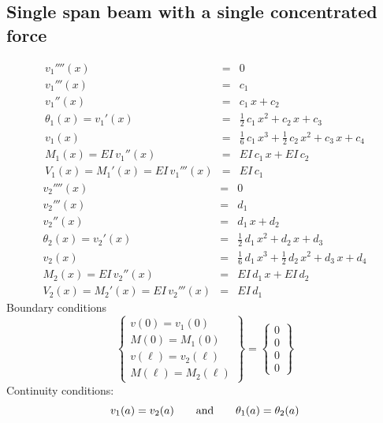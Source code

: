 \documentclass[11pt, oneside]{article}   	%
\begin{document}
\subsection{Single span beam with a single concentrated force}

\begin{eqnarray}
   v_1''''(x) &=&  0 \\
   v_1'''(x) &=&   c_1 \\
   v_1''(x) &=&   c_1\,x + c_2  \\
   \theta_1(x) = v_1'(x) &=&  \frac{1}{2} \,c_1\,x^2 + c_2\,x + c_3 \\
   v_1(x) &=&  \frac{1}{6} \,c_1\,x^3 + \frac{1}{2} \,c_2\,x^2+ c_3\,x + c_4 \\
   M_1(x) = EI \, v_1''(x) &=&  EI\,c_1\,x + EI\,c_2 \\
   V_1(x) = M_1'(x) = EI \, v_1'''(x) &=& EI\,c_1
   \label{B1}
\end{eqnarray}
\begin{eqnarray}
   v_2''''(x) &=&  0 \\
   v_2'''(x) &=&   d_1 \\
   v_2''(x) &=&   d_1\,x + d_2  \\
   \theta_2(x) = v_2'(x) &=&   \frac{1}{2} \,d_1\,x^2 + d_2\,x + d_3 \\
   v_2(x) &=&   \frac{1}{6} \,d_1\,x^3 + \frac{1}{2} \,d_2\,x^2+ d_3\,x + d_4 \\
   M_2(x) = EI \, v_2''(x) &=&  EI\,d_1\,x + EI\,d_2 \\
   V_2(x) = M_2'(x) = EI \, v_2'''(x) &=&  EI\,d_1
   \label{B2}
\end{eqnarray}
Boundary conditions
\begin{equation}
   \left\{ 
   \begin{array}{c}
   v(0) = v_1(0) \\
   M(0) = M_1(0) \\
   v(\ell) = v_2(\ell) \\
   M(\ell) = M_2(\ell)
   \end{array}
   \right\}
   =
   \left\{ 
   \begin{array}{c}
    0 \\
    0 \\
    0 \\
    0 
   \end{array}
   \right\}
   \label{B3}
\end{equation}
Continuity conditions:
\begin{equation}
   v_1(a) = v_2(a)
   \qquad\hbox{and}\qquad
   \theta_1(a) = \theta_2(a)
   \label{B4}
\end{equation}
\end{document}
